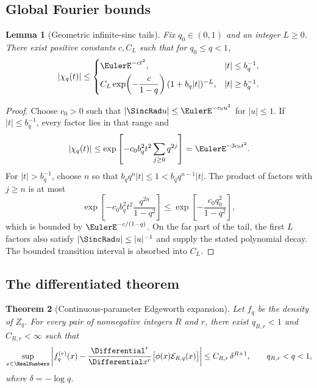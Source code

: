 \documentclass[11pt,a4paper]{article}
\newtheorem{theorem}{Theorem}[section]
\newtheorem{lemma}[theorem]{Lemma}
\theoremstyle{definition}
\begin{document}
\subsection{Global Fourier bounds}

\begin{lemma}[Geometric infinite-sinc tails]
\label{lem:sinc-tail}
Fix $q_0\in(0,1)$ and an integer $L\ge0$.  There exist positive constants
$c,C_L$ such that for $q_0\le q<1$,
\begin{equation}
 |\chi_q(t)|\le
 \begin{cases}
   \EulerE^{-ct^2},& |t|\le b_q^{-1},\\[1mm]
   C_L\exp\!\left(-\dfrac{c}{1-q}\right)
   (1+b_q|t|)^{-L},& |t|\ge b_q^{-1}.
 \end{cases}
 \label{eq:sinc-tail-bound}
\end{equation}
\end{lemma}

\begin{proof}
Choose $c_0>0$ such that
$|\SincRad u|\le \EulerE^{-c_0u^2}$ for $|u|\le1$.  If
$|t|\le b_q^{-1}$, every factor lies in that range and
\[
 |\chi_q(t)|\le
 \exp\left[-c_0b_q^2t^2\sum_{j\ge0}q^{2j}\right]
 =\EulerE^{-3c_0t^2}.
\]
For $|t|>b_q^{-1}$, choose $n$ so that
$b_qq^n|t|\le1<b_qq^{n-1}|t|$.  The product of factors with $j\ge n$ is at
most
\[
 \exp\left[-c_0b_q^2t^2\frac{q^{2n}}{1-q^2}\right]
 \le \exp\left[-\frac{c_0q_0^2}{1-q^2}\right],
\]
which is bounded by $\EulerE^{-c/(1-q)}$.  On the far part of the tail, the first
$L$ factors also satisfy $|\SincRad u|\le|u|^{-1}$ and supply the stated
polynomial decay.  The bounded transition interval is absorbed into $C_L$.
\end{proof}

\subsection{The differentiated theorem}

\begin{theorem}[Continuous-parameter Edgeworth expansion]
\label{thm:Edgeworth}
Let $f_q$ be the density of $Z_q$.  For every pair of nonnegative integers
$R$ and $r$, there exist $q_{R,r}<1$ and $C_{R,r}<\infty$ such that
\begin{equation}
 \sup_{x\in\RealNumbers}
 \left|
 f_q^{(r)}(x)-
 \frac{\Differential^r}{\Differential x^r}
 \bigl[\phi(x)\mathcal E_{R,q}(x)\bigr]
 \right|
 \le C_{R,r}\,\delta^{R+1},
 \qquad q_{R,r}<q<1,
 \label{eq:Edgeworth-theorem}
\end{equation}
where $\delta=-\log q$.
\end{theorem}
\end{document}
